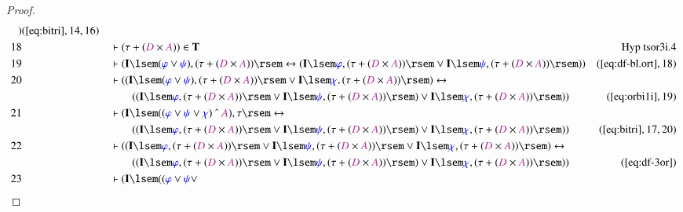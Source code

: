\begin{proof}
\begin{align}
      )&(\mbox{\ref{eq:bitri}},14,16)\notag
  \\ 18 &&  & \vdash ( \tau + ( \mc{D} \times \mc{A} ) ) \in
      \mathbf{T}&\text{Hyp~tsor3i.4}\notag%
  \\ 19 &&  & \vdash ( \mathbf{I} \lsem ( \mw{\varphi} \vee \mw{\psi} ) , (
      \tau + ( \mc{D} \times \mc{A} ) ) \rsem
      \leftrightarrow ( \mathbf{I} \lsem \mw{\varphi} , (
      \tau + ( \mc{D} \times \mc{A} ) ) \rsem \vee
      \mathbf{I} \lsem \mw{\psi} , ( \tau + ( \mc{D} \times
      \mc{A} ) ) \rsem )
      )&(\mbox{\ref{eq:df-bl.ort}},18)\notag
  \\ 20 &&  & \vdash ( ( \mathbf{I} \lsem ( \mw{\varphi} \vee \mw{\psi} ) , (
      \tau + ( \mc{D} \times \mc{A} ) ) \rsem \vee
      \mathbf{I} \lsem \mw{\chi} , ( \tau + ( \mc{D} \times
      \mc{A} ) ) \rsem ) \leftrightarrow  \notag \\ & & & \qquad
     ( ( \mathbf{I}
      \lsem \mw{\varphi} , ( \tau + ( \mc{D} \times \mc{A} )
      ) \rsem \vee \mathbf{I} \lsem \mw{\psi} , ( \tau + (
      \mc{D} \times \mc{A} ) ) \rsem ) \vee \mathbf{I} \lsem
      \mw{\chi} , ( \tau + ( \mc{D} \times \mc{A} ) ) \rsem
      ) )&(\mbox{\ref{eq:orbi1i}},19)\notag
  \\ 21 &&  & \vdash ( \mathbf{I} \lsem ( ( \mw{\varphi} \vee \mw{\psi} \vee
      \mw{\chi} ) ~\string^~ \mc{A} ) , \tau \rsem
      \leftrightarrow  \notag \\ & & & \qquad
     ( ( \mathbf{I} \lsem \mw{\varphi} , (
      \tau + ( \mc{D} \times \mc{A} ) ) \rsem \vee
      \mathbf{I} \lsem \mw{\psi} , ( \tau + ( \mc{D} \times
      \mc{A} ) ) \rsem ) \vee \mathbf{I} \lsem \mw{\chi} ,
      ( \tau + ( \mc{D} \times \mc{A} ) ) \rsem )
      )&(\mbox{\ref{eq:bitri}},17,20)\notag
  \\ 22 &&  & \vdash ( ( \mathbf{I} \lsem \mw{\varphi} , ( \tau + ( \mc{D}
      \times \mc{A} ) ) \rsem \vee \mathbf{I} \lsem
      \mw{\psi} , ( \tau + ( \mc{D} \times \mc{A} ) ) \rsem
      \vee \mathbf{I} \lsem \mw{\chi} , ( \tau + ( \mc{D}
      \times \mc{A} ) ) \rsem ) \leftrightarrow  \notag \\ & & & \qquad
     ( (
      \mathbf{I} \lsem \mw{\varphi} , ( \tau + ( \mc{D}
      \times \mc{A} ) ) \rsem \vee \mathbf{I} \lsem
      \mw{\psi} , ( \tau + ( \mc{D} \times \mc{A} ) ) \rsem
      ) \vee \mathbf{I} \lsem \mw{\chi} , ( \tau + ( \mc{D}
      \times \mc{A} ) ) \rsem )
      )&(\mbox{\ref{eq:df-3or}})\notag
  \\ 23 &&  & \vdash ( \mathbf{I} \lsem ( ( \mw{\varphi} \vee \mw{\psi} \vee

\end{align}
\end{proof}
